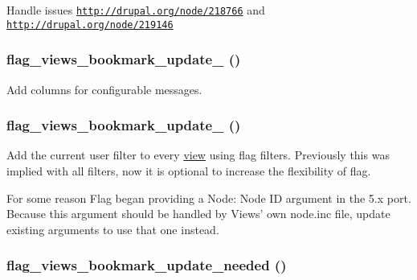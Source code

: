 Handle issues \href{http://drupal.org/node/218766}{\tt http://drupal.org/node/218766} and \href{http://drupal.org/node/219146}{\tt http://drupal.org/node/219146} \hypertarget{flag_8views__bookmark_8inc_37e9f392694b130110e5f2cb26b31cb4}{
\subsubsection[{flag\_\-views\_\-bookmark\_\-update\_\-6}]{\setlength{\rightskip}{0pt plus 5cm}flag\_\-views\_\-bookmark\_\-update\_ ()}}
\label{flag_8views__bookmark_8inc_37e9f392694b130110e5f2cb26b31cb4}


Add columns for configurable messages. \hypertarget{flag_8views__bookmark_8inc_4f23f5f0988c3bc3f7bfcb815f8fd260}{
\subsubsection[{flag\_\-views\_\-bookmark\_\-update\_\-7}]{\setlength{\rightskip}{0pt plus 5cm}flag\_\-views\_\-bookmark\_\-update\_ ()}}
\label{flag_8views__bookmark_8inc_4f23f5f0988c3bc3f7bfcb815f8fd260}


Add the current user filter to every \hyperlink{classview}{view} using flag filters. Previously this was implied with all filters, now it is optional to increase the flexibility of flag.

For some reason Flag began providing a Node: Node ID argument in the 5.x port. Because this argument should be handled by Views' own node.inc file, update existing arguments to use that one instead. \hypertarget{flag_8views__bookmark_8inc_d5cfa5dcf805c66fc0c86511acb5a237}{
\subsubsection[{flag\_\-views\_\-bookmark\_\-update\_\-needed}]{\setlength{\rightskip}{0pt plus 5cm}flag\_\-views\_\-bookmark\_\-update\_\-needed ()}}
\label{flag_8views__bookmark_8inc_d5cfa5dcf805c66fc0c86511acb5a237}


